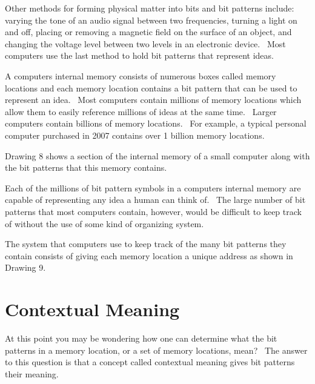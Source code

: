 \documentclass[12pt,twoside]{book}
\begin{document}
\bigskip

Other methods for forming physical matter into bits and bit patterns include: varying the tone of an audio signal between two frequencies, turning a light on and off, placing or removing a magnetic field on the surface of an object, and changing the voltage level between two levels in an electronic device. \ Most computers use the last method to hold bit patterns that represent ideas. 

\bigskip

A computer{\textquotesingle}s internal memory consists of numerous {\textquotedbl}boxes{\textquotedbl} called memory locations and each memory location contains a bit pattern that can be used to represent an idea. \ Most computers contain millions of memory locations which allow them to easily reference millions of ideas at the same time. \ Larger computers contain billions of memory locations. \ For example, a typical personal computer purchased in 2007 contains over 1 billion memory locations. \  

\bigskip

Drawing 8 shows a section of the internal memory of a small computer along with the bit patterns that this memory contains. 

\bigskip


\bigskip

Each of the millions of bit pattern symbols in a computer{\textquotesingle}s internal memory are capable of representing any idea a human can think of. \ The large number of bit patterns that most computers contain, however, would be difficult to keep track of without the use of some kind of organizing system.


\bigskip

The system that computers use to keep track of the many bit patterns they contain consists of giving each memory location a unique address as shown in Drawing 9. 

\bigskip

\section[Contextual Meaning]{Contextual Meaning}

At this point you may be wondering {\textquotedbl}how one can determine what the bit patterns in a memory location, or a set of memory locations, mean?{\textquotedbl} \ The answer to this question is that a concept called contextual meaning gives bit patterns their meaning. 
\end{document}
